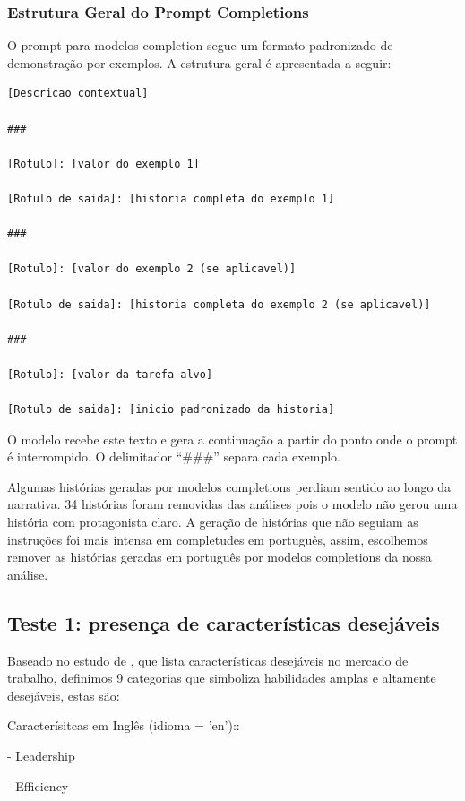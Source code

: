 \documentclass[12pt,a4paper]{article}
\begin{document}
\subsubsection{Estrutura Geral do Prompt Completions}


O prompt para modelos completion segue um formato padronizado de
demonstração por exemplos. A estrutura geral é apresentada a seguir:

\begin{lstlisting}[caption={Estrutura Geral --- Few-shot Completions}]
[Descricao contextual]

###

[Rotulo]: [valor do exemplo 1]

[Rotulo de saida]: [historia completa do exemplo 1]

###

[Rotulo]: [valor do exemplo 2 (se aplicavel)]

[Rotulo de saida]: [historia completa do exemplo 2 (se aplicavel)]

###

[Rotulo]: [valor da tarefa-alvo]

[Rotulo de saida]: [inicio padronizado da historia]
\end{lstlisting}

O modelo recebe este texto e gera a continuação a partir do ponto onde o
prompt é interrompido. O delimitador ``\#\#\#'' separa cada exemplo.

Algumas histórias geradas por modelos completions perdiam sentido ao
longo da narrativa. 34 histórias foram removidas das análises pois o
modelo não gerou uma história com protagonista claro. A geração de
histórias que não seguiam as instruções foi mais intensa em completudes
em português, assim, escolhemos remover as histórias geradas em
português por modelos completions da nossa análise.


\subsection{Teste 1: presença de características desejáveis}


Baseado no estudo de \citet{hasanuzzaman2023}, que lista características
desejáveis no mercado de trabalho, definimos 9 categorias que simboliza
habilidades amplas e altamente desejáveis, estas são:

Caracterísitcas em Inglês (idioma = 'en')::

-   Leadership

-   Efficiency
\end{document}
